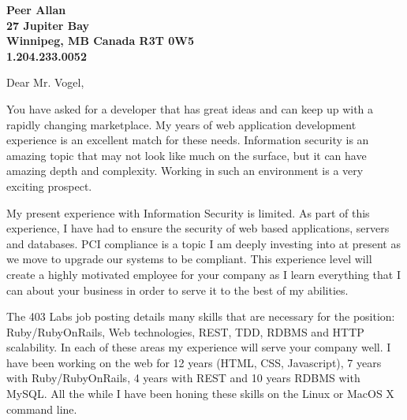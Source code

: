 \documentclass[11pt]{letter} %
\begin{document}

\begin{letter}{} 


\begin{center}
\large\bf Peer Allan \\ %
27 Jupiter Bay \\ Winnipeg, MB Canada R3T 0W5 \\ 1.204.233.0052 %
\end{center} 
\vfill

\signature{Peer Allan} %


\opening{Dear Mr. Vogel,} 

You have asked for a developer that has great ideas and can keep up with a rapidly changing marketplace. My years of web application development experience is an excellent match for these needs. Information security is an amazing topic that may not look like much on the surface, but it can have amazing depth and complexity. Working in such an environment is a very exciting prospect.

My present experience with Information Security is limited. As part of this experience, I have had to ensure the security of web based applications, servers and databases. PCI compliance is a topic I am deeply investing into at present as we move to upgrade our systems to be compliant. This experience level will create a highly motivated employee for your company as I learn everything that I can about your business in order to serve it to the best of my abilities.

The 403 Labs job posting details many skills that are necessary for the position: Ruby/RubyOnRails, Web technologies, REST, TDD, RDBMS and HTTP scalability. In each of these areas my experience will serve your company well. I have been working on the web for 12 years (HTML, CSS, Javascript), 7 years with Ruby/RubyOnRails, 4 years with REST and 10 years RDBMS with MySQL. All the while I have been honing these skills on the Linux or MacOS X command line.


\end{letter}
\end{document}
